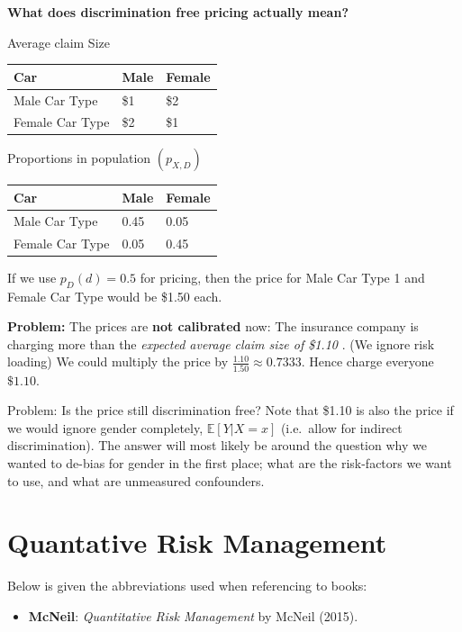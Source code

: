 \documentclass[a4paper,10pt,openany]{book}
\providecommand{\tightlist}{%
 \setlength{\itemsep}{0pt}\setlength{\parskip}{0pt}}
\begin{document}
\textbf{What does discrimination free pricing actually mean?}

Average claim Size

\begin{longtable}[]{@{}lll@{}}
\toprule()
Car & Male & Female \\
\midrule()
\endhead
Male Car Type & \$1 & \$2 \\
Female Car Type & \$2 & \$1 \\
\bottomrule()
\end{longtable}

Proportions in population \((p_{X,D})\)

\begin{longtable}[]{@{}lll@{}}
\toprule()
Car & Male & Female \\
\midrule()
\endhead
Male Car Type & 0.45 & 0.05 \\
Female Car Type & 0.05 & 0.45 \\
\bottomrule()
\end{longtable}

If we use \(p_D(d) = 0.5\) for pricing, then the price for Male Car Type 1 and Female Car Type would be \$1.50 each.

\textbf{Problem:} The prices are \textbf{not calibrated} now: The insurance company is charging more than the \emph{expected average claim size of \$1.10 }. (We ignore risk loading) We could multiply the price by \(\frac{1.10}{1.50}\approx 0.7333\). Hence charge everyone \(\$1.10\).

Problem: Is the price still discrimination free? Note that \$1.10 is also the price if we would ignore gender completely, \(\mathbb E[Y|X=x]\) (i.e.~allow for indirect discrimination). The answer will most likely be around the question why we wanted to de-bias for gender in the first place; what are the risk-factors we want to use, and what are unmeasured confounders.

\hypertarget{quantative-risk-management}{%
\chapter{Quantative Risk Management}\label{quantative-risk-management}}

Below is given the abbreviations used when referencing to books:

\begin{itemize}
\tightlist
\item
  \textbf{McNeil}: \emph{Quantitative Risk Management} by McNeil (2015).\cite{mcneil2015}
\end{itemize}
\end{document}
